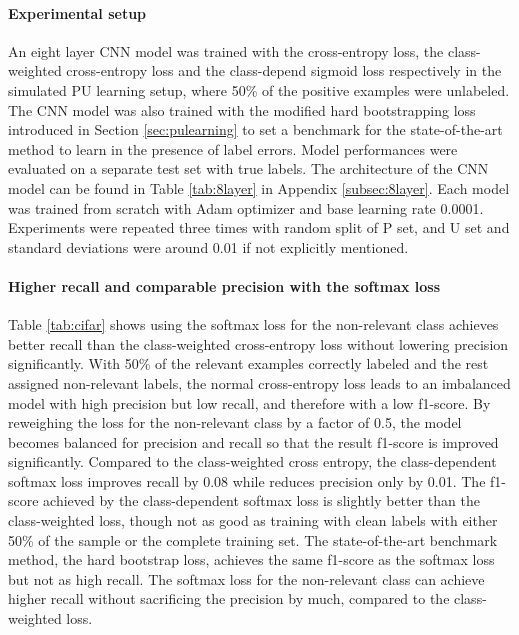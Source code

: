 \paragraph{Experimental setup}
An eight layer CNN model was trained with the cross-entropy loss, the class-weighted cross-entropy loss and the class-depend sigmoid loss respectively in the simulated PU learning setup, where 50\% of the positive examples were unlabeled.
The CNN model was also trained with the modified hard bootstrapping loss introduced in Section \ref{sec:pulearning} to set a benchmark for the state-of-the-art method to learn in the presence of label errors.
Model performances were evaluated on a separate test set with true labels.
The architecture of the CNN model can be found in Table \ref{tab:8layer} in Appendix \ref{subsec:8layer}.
Each model was trained from scratch with Adam optimizer and base learning rate 0.0001.
Experiments were repeated three times with random split of P set, and U set and standard deviations were around 0.01 if not explicitly mentioned.


\paragraph{Higher recall and comparable precision with the softmax loss}

Table \ref{tab:cifar} shows using the softmax loss for the non-relevant class achieves better recall than the class-weighted cross-entropy loss without lowering precision significantly.
With 50\% of the relevant examples correctly labeled and the rest assigned non-relevant labels, the normal cross-entropy loss leads to an imbalanced model with high precision but low recall, and therefore with a low f1-score.
By reweighing the loss for the non-relevant class by a factor of 0.5, the model becomes balanced for precision and recall so that the result f1-score is improved significantly.
Compared to the class-weighted cross entropy, the class-dependent softmax loss improves recall by 0.08 while reduces precision only by 0.01.
The f1-score achieved by the class-dependent softmax loss is slightly better than the class-weighted loss, though not as good as training with clean labels with either 50\% of the sample or the complete training set.
The state-of-the-art benchmark method, the hard bootstrap loss, achieves the same f1-score as the softmax loss but not as high recall.
The softmax loss for the non-relevant class can achieve higher recall without sacrificing the precision by much, compared to the class-weighted loss.

